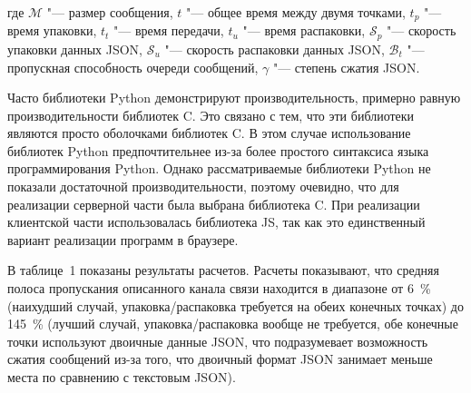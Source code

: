 \noindent где ${\mathcal{M}}$ "--- размер сообщения, $t$ "--- общее время между двумя точками, $t_p$ "--- время упаковки, $t_t$ "--- время передачи, $t_u$ "--- время распаковки, $\mathcal{S}_p$ "--- скорость упаковки данных JSON, $\mathcal{S}_u$ "--- скорость распаковки данных JSON, $\mathcal{B}_t$ "--- пропускная способность очереди сообщений, $\gamma$ "--- степень сжатия JSON.

Часто библиотеки Python демонстрируют производительность, примерно равную производительности библиотек C. Это связано с тем, что эти библиотеки являются просто оболочками библиотек C. В этом случае использование библиотек Python предпочтительнее из-за более простого синтаксиса языка программирования Python. Однако рассматриваемые библиотеки Python не показали достаточной производительности, поэтому очевидно, что для реализации серверной части была выбрана библиотека C. При реализации клиентской части использовалась библиотека JS, так как это единственный вариант реализации программ в браузере.

В таблице~1 показаны результаты расчетов. Расчеты показывают, что средняя полоса пропускания описанного канала связи находится в диапазоне от \SI{6}{\percent} (наихудший случай, упаковка/распаковка требуется на обеих конечных точках) до \SI{145}{\percent} (лучший случай, упаковка/распаковка вообще не требуется, обе конечные точки используют двоичные данные JSON, что подразумевает возможность сжатия сообщений из-за того, что двоичный формат JSON занимает меньше места по сравнению с текстовым JSON).

